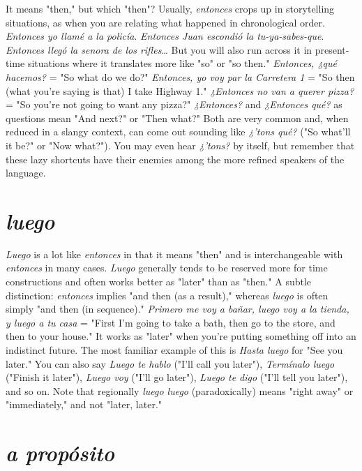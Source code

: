 It means "then," but which "then"? Usually, \emph{entonces} crops
up in storytelling situations, as when you are relating what happened
in chronological order. \emph{Entonces yo llamé a la policía}. \emph{Entonces Juan
escondió la tu-ya-sabes-que}. \emph{Entonces llegó la senora de los rifles}\ldots{}
But you will also run across it in present-time situations where it
translates more like "so" or "so then." \emph{Entonces, ¿qué hacemos?} = "So
what do we do?" \emph{Entonces, yo voy par la Carretera 1} = "So then (what
you're saying is that) I take Highway 1." \emph{¿Entonces no van a querer
pizza?} = "So you're not going to want any pizza?" \emph{¿Entonces?} and \emph{¿Entonces qué?} as questions mean "And next?" or "Then what?" Both are
very common and, when reduced in a slangy context, can come out
sounding like \emph{¿'tons qué?} ("So what'll it be?" or "Now what?").
You
may even hear \emph{¿'tons?} by itself, but remember that these lazy shortcuts
have their enemies among the more refined speakers of the language.

\section{\emph{luego}}

\emph{Luego} is a lot like \emph{entonces} in that it means "then" and is interchangeable with \emph{entonces} in many cases. \emph{Luego} generally tends
to be reserved more for time constructions and often works better as
"later" than as "then." A subtle distinction: \emph{entonces} implies "and
then (as a result)," whereas \emph{luego} is often simply "and then (in sequence)." \emph{Primero me voy a bañar, luego voy a la tienda, y luego a tu
casa} = "First I'm going to take a bath, then go to the store, and then
to your house." It works as "later" when you're putting something off
into an indistinct future. The most familiar example of this is \emph{Hasta
luego} for "See you later." You can also say \emph{Luego te hablo} ("I'll call
you later"), \emph{Termínalo luego} ("Finish it later"), \emph{Luego voy} ("I'll go
later"), \emph{Luego te digo} ("I'll tell you later"), and so on. Note that regionally \emph{luego luego} (paradoxically) means "right away" or "immediately,"
and not "later, later."

\section{\emph{a propósito}}


